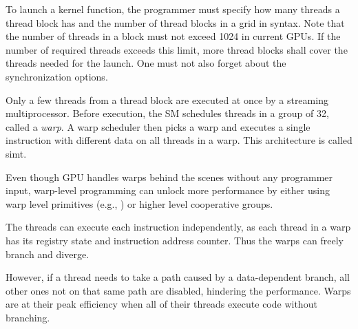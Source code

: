 To launch a kernel function, the programmer must specify how many threads a thread block has and the number of thread blocks in a grid in  syntax. Note that the number of threads in a block must not exceed 1024 in current GPUs. If the number of required threads exceeds this limit, more thread blocks shall cover the threads needed for the launch. One must not also forget about the synchronization options.

Only a few threads from a thread block are executed at once by a streaming multiprocessor. Before execution, the SM schedules threads in a group of 32, called a \textit{warp}. A warp scheduler then picks a warp and executes a single instruction with different data on all threads in a warp. This architecture is called \acrfull{simt}.

Even though GPU handles warps behind the scenes without any programmer input, warp-level programming can unlock more performance by either using warp level primitives (e.g., ) or higher level cooperative groups.

The threads can execute each instruction independently, as each thread in a warp has its registry state and instruction address counter. Thus the warps can freely branch and diverge.

However, if a thread needs to take a path caused by a data-dependent branch, all other ones not on that same path are disabled, hindering the performance. Warps are at their peak efficiency when all of their threads execute code without branching.